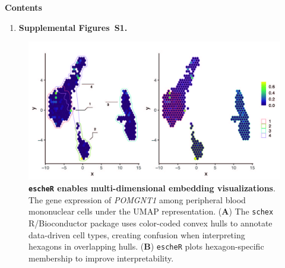 \documentclass[10pt,twocolumn]{article}
\begin{document}
\vspace*{1cm}

{\bf \large Contents}

\begin{enumerate}
    \item \textbf{Supplemental Figures~S1.}
\end{enumerate}

\clearpage 



\begin{figure}[!h]
\begin{center}
\includegraphics[width=\textwidth]{Manuscript/figure/embedding.jpg}
\caption{\small \textbf{\texttt{escheR} enables multi-dimensional embedding visualizations}. The gene expression of \textit{POMGNT1} among peripheral blood mononuclear cells \cite{PBMC} under the UMAP representation. (\textbf{A}) The \texttt{schex} R/Bioconductor package uses color-coded convex hulls to annotate data-driven cell types, creating confusion when interpreting hexagons in overlapping hulls. (\textbf{B}) \texttt{escheR} plots hexagon-specific membership to improve interpretability.}
\label{fig:embedding} 
\end{center}
\end{figure}
\end{document}
